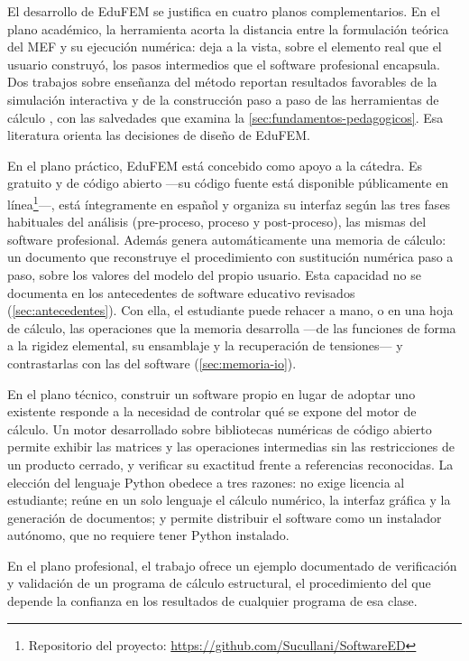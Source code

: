 El desarrollo de EduFEM se justifica en cuatro planos complementarios. En el plano académico, la herramienta acorta la distancia entre la formulación teórica del MEF y su ejecución numérica: deja a la vista, sobre el elemento real que el usuario construyó, los pasos intermedios que el software profesional encapsula. Dos trabajos sobre enseñanza del método reportan resultados favorables de la simulación interactiva y de la construcción paso a paso de las herramientas de cálculo \autocites[p.~168]{lee2015interactive}[p.~1023]{bishay2020teaching}, con las salvedades que examina la \autoref{sec:fundamentos-pedagogicos}. Esa literatura orienta las decisiones de diseño de EduFEM.

En el plano práctico, EduFEM está concebido como apoyo a la cátedra. Es gratuito y de código abierto —su código fuente está disponible públicamente en línea\footnote{Repositorio del proyecto: \url{https://github.com/Sucullani/SoftwareED}}—, está íntegramente en español y organiza su interfaz según las tres fases habituales del análisis (pre-proceso, proceso y post-proceso), las mismas del software profesional. Además genera automáticamente una memoria de cálculo: un documento que reconstruye el procedimiento con sustitución numérica paso a paso, sobre los valores del modelo del propio usuario. Esta capacidad no se documenta en los antecedentes de software educativo revisados (\autoref{sec:antecedentes}). Con ella, el estudiante puede rehacer a mano, o en una hoja de cálculo, las operaciones que la memoria desarrolla ---de las funciones de forma a la rigidez elemental, su ensamblaje y la recuperación de tensiones--- y contrastarlas con las del software (\autoref{sec:memoria-io}).

En el plano técnico, construir un software propio en lugar de adoptar uno existente responde a la necesidad de controlar qué se expone del motor de cálculo. Un motor desarrollado sobre bibliotecas numéricas de código abierto \autocite{harris2020numpy,virtanen2020scipy} permite exhibir las matrices y las operaciones intermedias sin las restricciones de un producto cerrado, y verificar su exactitud frente a referencias reconocidas. La elección del lenguaje Python obedece a tres razones: no exige licencia al estudiante; reúne en un solo lenguaje el cálculo numérico, la interfaz gráfica y la generación de documentos; y permite distribuir el software como un instalador autónomo, que no requiere tener Python instalado.

En el plano profesional, el trabajo ofrece un ejemplo documentado de verificación y validación de un programa de cálculo estructural, el procedimiento del que depende la confianza en los resultados de cualquier programa de esa clase.


